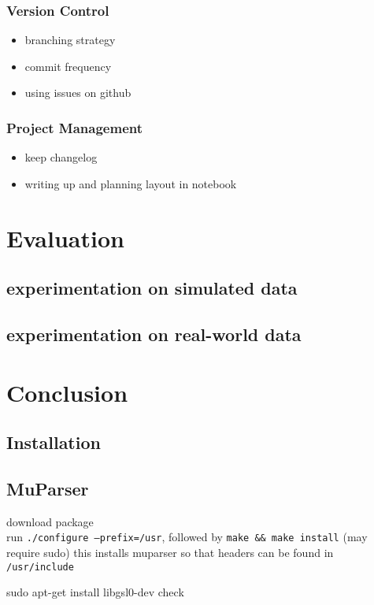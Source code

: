 \documentclass[a4paper,12pt]{article}
\begin{document}
\subsubsection{Version Control}
\label{sec-6-2-2}

\begin{itemize}
\item branching strategy
\item commit frequency
\item using issues on github
\end{itemize}
\subsubsection{Project Management}
\label{sec-6-2-3}

\begin{itemize}
\item keep changelog
\item writing up and planning layout in notebook
\end{itemize}
\section{Evaluation}
\label{sec-7}
\subsection{experimentation on simulated data}
\label{sec-7-1}
\subsection{experimentation on real-world data}
\label{sec-7-2}
\section{Conclusion}
\label{sec-8}



\newpage
\begin{appendices}
\section{Installation}
\label{sec-9}
\subsection{MuParser}
\label{sec-9-1}

 download package\\
 run \texttt{./configure --prefix=/usr}, followed by \texttt{make \&\& make install} (may require sudo)
 this installs muparser so that headers can be found in \texttt{/usr/include}
    
    sudo apt-get install libgsl0-dev check 

\end{appendices}
\end{document}
